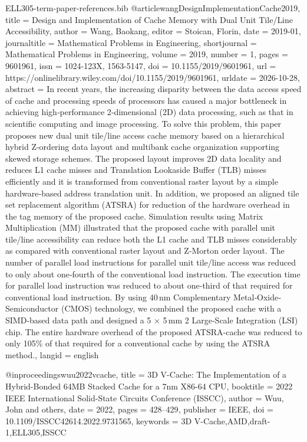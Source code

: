 \begin{filecontents*}[overwrite]{ELL305-term-paper-references.bib}
@article{wangDesignImplementationCache2019,
  title = {Design and {{Implementation}} of {{Cache Memory}} with {{Dual Unit Tile}}/{{Line Accessibility}}},
  author = {Wang, Baokang},
  editor = {Stoican, Florin},
  date = {2019-01},
  journaltitle = {Mathematical Problems in Engineering},
  shortjournal = {Mathematical Problems in Engineering},
  volume = {2019},
  number = {1},
  pages = {9601961},
  issn = {1024-123X, 1563-5147},
  doi = {10.1155/2019/9601961},
  url = {https://onlinelibrary.wiley.com/doi/10.1155/2019/9601961},
  urldate = {2026-10-28},
  abstract = {In recent years, the increasing disparity between the data access speed of cache and processing speeds of processors has caused a major bottleneck in achieving high‐performance 2‐dimensional (2D) data processing, such as that in scientific computing and image processing. To solve this problem, this paper proposes new dual unit tile/line access cache memory based on a hierarchical hybrid Z‐ordering data layout and multibank cache organization supporting skewed storage schemes. The proposed layout improves 2D data locality and reduces L1 cache misses and Translation Lookaside Buffer (TLB) misses efficiently and it is transformed from conventional raster layout by a simple hardware‐based address translation unit. In addition, we proposed an aligned tile set replacement algorithm (ATSRA) for reduction of the hardware overhead in the tag memory of the proposed cache. Simulation results using Matrix Multiplication (MM) illustrated that the proposed cache with parallel unit tile/line accessibility can reduce both the L1 cache and TLB misses considerably as compared with conventional raster layout and Z‐Morton order layout. The number of parallel load instructions for parallel unit tile/line access was reduced to only about one‐fourth of the conventional load instruction. The execution time for parallel load instruction was reduced to about one‐third of that required for conventional load instruction. By using 40\,nm Complementary Metal‐Oxide‐Semiconductor (CMOS) technology, we combined the proposed cache with a SIMD‐based data path and designed a 5 × 5\,mm               2               Large‐Scale Integration (LSI) chip. The entire hardware overhead of the proposed ATSRA‐cache was reduced to only 105\% of that required for a conventional cache by using the ATSRA method.},
  langid = {english}
}

@inproceedings{wuu2022vcache,
  title = {{{3D}} V-Cache: {{The}} Implementation of a Hybrid-Bonded {{64MB}} Stacked Cache for a 7nm X86-64 {{CPU}}},
  booktitle = {2022 {{IEEE}} International Solid-State Circuits Conference ({{ISSCC}})},
  author = {Wuu, John and others},
  date = {2022},
  pages = {428--429},
  publisher = {IEEE},
  doi = {10.1109/ISSCC42614.2022.9731565},
  keywords = {3D V-Cache,AMD,draft-1,ELL305,ISSCC}
}
\end{filecontents*}
\documentclass[12pt,a4paper,twoside]{article}

